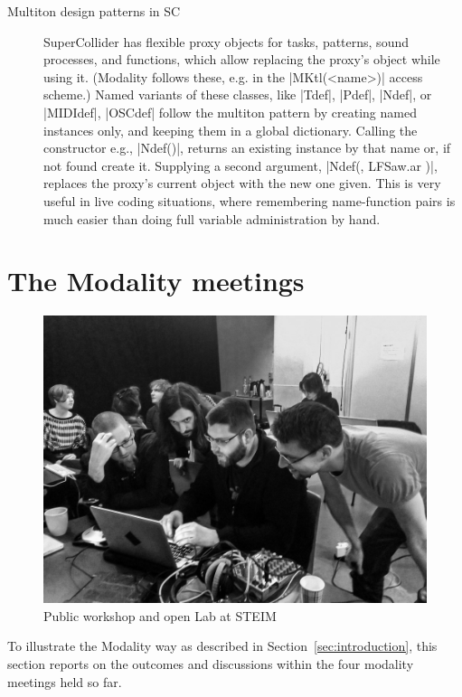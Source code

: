 \documentclass{article}
\begin{document}
\begin{description}
	\item[Multiton design patterns in SC] 
		SuperCollider has flexible proxy objects for tasks, patterns, sound processes, and functions, which allow replacing the proxy's object while using it. (Modality follows these, e.g. in the |MKtl(<name>)| access scheme.)
		Named variants of these classes, like |Tdef|, |Pdef|, |Ndef|, or |MIDIdef|, |OSCdef| follow the multiton pattern by creating named instances only, and keeping them in a global dictionary. 
		Calling the constructor e.g., |Ndef(\a)|, returns an existing instance by that name or, if not found create it. 
		Supplying a second argument, |Ndef(\a, { LFSaw.ar })|, replaces the proxy's current object with the new one given. 
		This is very useful in live coding situations, where remembering name-function pairs is much easier than doing full  variable administration by hand.
\end{description}




\section{The Modality meetings}
\label{sec:the_modality_meetings}

\begin{figure}[h]
	\centering
		\includegraphics[width=.9\columnwidth]{../media/20140403-IMG_1667.jpg}
	\caption{Public workshop and open Lab at STEIM}
	\label{fig:media_20140403-IMG_1667}
\end{figure}

To illustrate the Modality way as described in Section~\ref{sec:introduction}, this section reports on the outcomes and discussions within the four modality meetings held so far.
\end{document}
